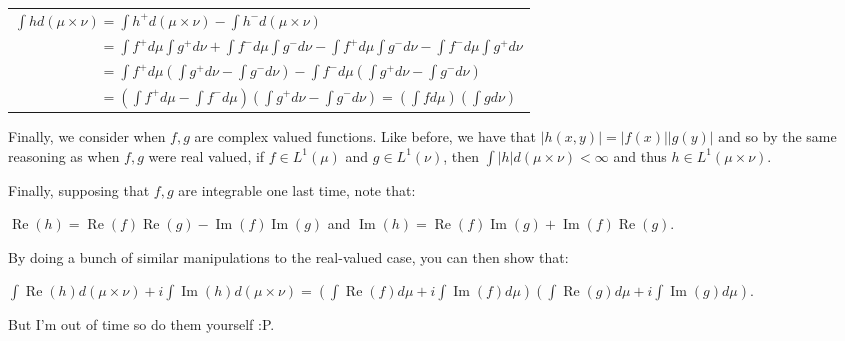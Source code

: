\documentclass{book}
\newcommand{\exPP}{%
   \color{RedViolet}%
   \fontsize{12}{14}\selectfont%
}
\newenvironment{myIndent}{%
   \begin{adjustwidth}{2.5em}{0em}%
}{%
   \end{adjustwidth}%
}
\DeclareMathOperator{\rea}{Re}
\DeclareMathOperator{\ima}{Im}
\newcommand{\retTwo}{\hfill\bigbreak}
\begin{document}
\begin{enumerate}
\begin{myIndent}
		{\centering\exPP
		\begin{tabular}{l}
			 $\int h d(\mu \times \nu) = \int h^+ d(\mu \times \nu) - \int h^- d(\mu \times \nu)$\\ [4pt]

			 $\phantom{\int h d(\mu \times \nu) } = \int f^+ d\mu \int g^+ d\nu + \int f^- d\mu \int g^- d\nu - \int f^+ d\mu \int g^- d\nu - \int f^- d\mu \int g^+ d\nu$\\ [4pt]

			 $\phantom{\int h d(\mu \times \nu) } = \int f^+ d\mu(\int g^+d\nu - \int g^- d\nu) - \int f^-d\mu (\int g^+ d\nu - \int g^- d\nu)$\\ [4pt]

			 $\phantom{\int h d(\mu \times \nu) } = (\int f^+d\mu - \int f^-d\mu)(\int g^+ d\nu - \int g^- d\nu) = (\int fd\mu)(\int gd\nu)$
		\end{tabular}\retTwo\par}

		Finally, we consider when $f, g$ are complex valued functions. Like before, we have that $|h(x, y)| = |f(x)||g(y)|$ and so by the same reasoning as when $f, g$ were real valued, if $f \in L^1(\mu)$ and $g \in L^1(\nu)$, then $\int |h|d(\mu \times \nu) < \infty$ and thus $h \in L^1(\mu \times \nu)$.

		Finally, supposing that $f, g$ are integrable one last time, note that:
		
		{\centering\exPP $\rea(h) = \rea(f)\rea(g) - \ima(f)\ima(g)$ and $\ima(h) = \rea(f)\ima(g) + \ima(f)\rea(g)$.\retTwo\par}

		By doing a bunch of similar manipulations to the real-valued case, you can then show that:
		
		{\centering\exPP $\int \rea(h) d(\mu \times \nu) + i \int \ima(h) d(\mu \times \nu) = (\int \rea(f)d\mu + i \int \ima(f)d\mu)(\int \rea(g)d\mu + i \int \ima(g)d\mu)$.\retTwo\par}

		But I'm out of time so do them yourself :P.
		\retTwo
	\end{myIndent}
\end{enumerate}
\end{document}
